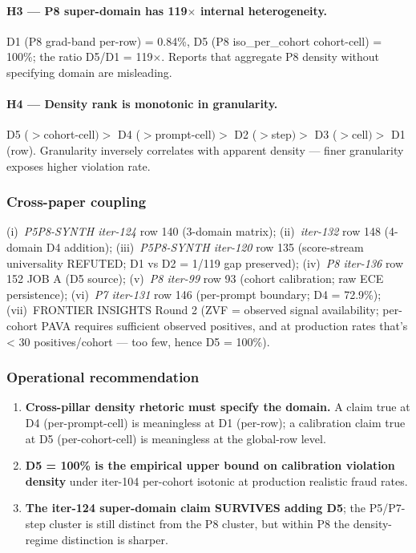 \paragraph{H3 --- P8 super-domain has 119$\times$ internal heterogeneity.} D1 (P8 grad-band
per-row) = 0.84\%, D5 (P8 iso\_per\_cohort cohort-cell) = 100\%; the ratio D5/D1 = 119$\times$.
Reports that aggregate P8 density without specifying domain are misleading.

\paragraph{H4 --- Density rank is monotonic in granularity.} D5 ($>$cohort-cell$) >$ D4
($>$prompt-cell$) >$ D2 ($>$step$) >$ D3 ($>$cell$) >$ D1 (row). Granularity inversely
correlates with apparent density --- finer granularity exposes higher violation rate.

\subsubsection{Cross-paper coupling}

(i)~\textit{P5P8-SYNTH iter-124} row 140 (3-domain matrix); (ii)~\textit{iter-132} row 148 (4-domain
D4 addition); (iii)~\textit{P5P8-SYNTH iter-120} row 135 (score-stream universality REFUTED;
D1 vs D2 = 1/119 gap preserved); (iv)~\textit{P8 iter-136} row 152 JOB A (D5 source); (v)~\textit{P8
iter-99} row 93 (cohort calibration; raw ECE persistence); (vi)~\textit{P7 iter-131} row 146
(per-prompt boundary; D4 = 72.9\%); (vii)~FRONTIER INSIGHTS Round 2 (ZVF = observed signal
availability; per-cohort PAVA requires sufficient observed positives, and at production rates
that's < 30 positives/cohort --- too few, hence D5 = 100\%).

\subsubsection{Operational recommendation}

\begin{enumerate}
\item \textbf{Cross-pillar density rhetoric must specify the domain.} A claim true at D4
      (per-prompt-cell) is meaningless at D1 (per-row); a calibration claim true at D5
      (per-cohort-cell) is meaningless at the global-row level.
\item \textbf{D5 = 100\% is the empirical upper bound on calibration violation density}
      under iter-104 per-cohort isotonic at production realistic fraud rates.
\item \textbf{The iter-124 super-domain claim SURVIVES adding D5}; the P5/P7-step cluster
      is still distinct from the P8 cluster, but within P8 the density-regime distinction is sharper.
\end{enumerate}
